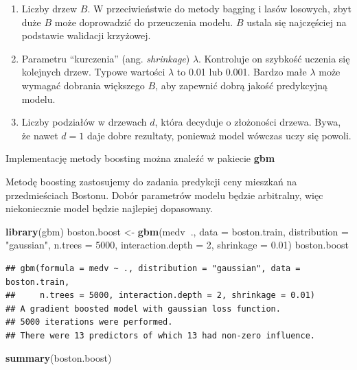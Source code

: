 \documentclass[]{book}
\newenvironment{Shaded}{\begin{snugshade}}{\end{snugshade}}
\newcommand{\DataTypeTok}[1]{\textcolor[rgb]{0.13,0.29,0.53}{#1}}
\newcommand{\DecValTok}[1]{\textcolor[rgb]{0.00,0.00,0.81}{#1}}
\newcommand{\FloatTok}[1]{\textcolor[rgb]{0.00,0.00,0.81}{#1}}
\newcommand{\KeywordTok}[1]{\textcolor[rgb]{0.13,0.29,0.53}{\textbf{#1}}}
\newcommand{\NormalTok}[1]{#1}
\newcommand{\OperatorTok}[1]{\textcolor[rgb]{0.81,0.36,0.00}{\textbf{#1}}}
\newcommand{\StringTok}[1]{\textcolor[rgb]{0.31,0.60,0.02}{#1}}
\providecommand{\tightlist}{%
  \setlength{\itemsep}{0pt}\setlength{\parskip}{0pt}}
\theoremstyle{plain}
\theoremstyle{definition}
\begin{document}
\begin{enumerate}
\def\labelenumi{\arabic{enumi}.}
\tightlist
\item
  Liczby drzew \(B\). W przeciwieństwie do metody bagging i lasów losowych, zbyt duże \(B\) może doprowadzić do przeuczenia modelu. \(B\) ustala się najczęściej na podstawie walidacji krzyżowej.
\item
  Parametru ``kurczenia'' (ang. \emph{shrinkage}) \(\lambda\). Kontroluje on szybkość uczenia się kolejnych drzew. Typowe wartości \(\lambda\) to 0.01 lub 0.001. Bardzo małe \(\lambda\) może wymagać dobrania większego \(B\), aby zapewnić dobrą jakość predykcyjną modelu.
\item
  Liczby podziałów w drzewach \(d\), która decyduje o złożoności drzewa. Bywa, że nawet \(d=1\) daje dobre rezultaty, ponieważ model wówczas uczy się powoli.
\end{enumerate}

Implementację metody boosting można znaleźć w pakiecie \textbf{gbm} \citep{R-gbm}

Metodę boosting zastosujemy do zadania predykcji ceny mieszkań na przedmieściach Bostonu. Dobór parametrów modelu będzie arbitralny, więc niekoniecznie model będzie najlepiej dopasowany.

\begin{Shaded}
\begin{Highlighting}[]
\KeywordTok{library}\NormalTok{(gbm)}
\NormalTok{boston.boost <-}\StringTok{ }\KeywordTok{gbm}\NormalTok{(medv}\OperatorTok{~}\NormalTok{., }\DataTypeTok{data =}\NormalTok{ boston.train,}
                    \DataTypeTok{distribution =} \StringTok{"gaussian"}\NormalTok{, }
                    \DataTypeTok{n.trees =} \DecValTok{5000}\NormalTok{,}
                    \DataTypeTok{interaction.depth =} \DecValTok{2}\NormalTok{,}
                    \DataTypeTok{shrinkage =} \FloatTok{0.01}\NormalTok{)}
\NormalTok{boston.boost}
\end{Highlighting}
\end{Shaded}

\begin{verbatim}
## gbm(formula = medv ~ ., distribution = "gaussian", data = boston.train, 
##     n.trees = 5000, interaction.depth = 2, shrinkage = 0.01)
## A gradient boosted model with gaussian loss function.
## 5000 iterations were performed.
## There were 13 predictors of which 13 had non-zero influence.
\end{verbatim}

\begin{Shaded}
\begin{Highlighting}[]
\KeywordTok{summary}\NormalTok{(boston.boost)}
\end{Highlighting}
\end{Shaded}
\end{document}
